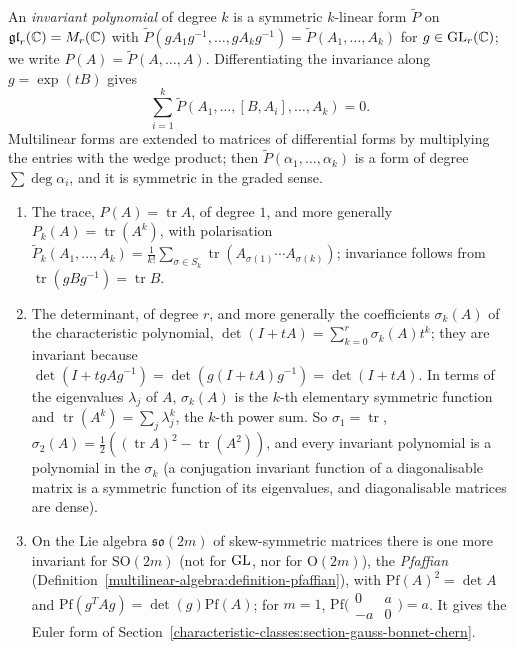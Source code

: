 \begin{definition}\label{characteristic-classes:definition-invariant-polynomial}
An \emph{invariant polynomial} of degree $k$ is a symmetric $k$-linear form $\tilde{P}$ on $\mathfrak{gl}_r(\mathbb{C}) = M_r(\mathbb{C})$ with
$\tilde{P}(gA_1g^{-1}, \ldots, gA_kg^{-1}) = \tilde{P}(A_1, \ldots, A_k)$ for $g \in \mathrm{GL}_r(\mathbb{C})$; we write $P(A) = \tilde{P}(A, \ldots, A)$. Differentiating the invariance along $g = \exp(tB)$ gives
\[
\sum_{i=1}^k\tilde{P}(A_1, \ldots, [B, A_i], \ldots, A_k) = 0 .
\]
Multilinear forms are extended to matrices of differential forms by multiplying the entries with the wedge product; then $\tilde{P}(\alpha_1, \ldots, \alpha_k)$ is a form of degree $\sum\deg\alpha_i$, and it is
symmetric in the graded sense.
\end{definition}

\begin{example}\label{characteristic-classes:example-invariant-polynomials}
\begin{enumerate}
\item The trace, $P(A) = \operatorname{tr}A$, of degree $1$, and more generally $P_k(A) = \operatorname{tr}(A^k)$, with polarisation
$\tilde P_k(A_1, \ldots, A_k) = \frac1{k!}\sum_{\sigma \in S_k}\operatorname{tr}(A_{\sigma(1)} \cdots A_{\sigma(k)})$; invariance follows from $\operatorname{tr}(gBg^{-1}) = \operatorname{tr}B$.
\item The determinant, of degree $r$, and more generally the coefficients $\sigma_k(A)$ of the characteristic polynomial,
$\det(I + tA) = \sum_{k=0}^r\sigma_k(A)t^k$; they are invariant because $\det(I + tgAg^{-1}) = \det(g(I + tA)g^{-1}) = \det(I + tA)$. In terms of the eigenvalues $\lambda_j$ of $A$,
$\sigma_k(A)$ is the $k$-th elementary symmetric function and $\operatorname{tr}(A^k) = \sum_j\lambda_j^k$, the $k$-th power sum. So $\sigma_1 = \operatorname{tr}$,
$\sigma_2(A) = \frac12((\operatorname{tr}A)^2 - \operatorname{tr}(A^2))$, and every invariant polynomial is a polynomial in the $\sigma_k$ (a conjugation invariant function of a
diagonalisable matrix is a symmetric function of its eigenvalues, and diagonalisable matrices are dense).
\item On the Lie algebra $\mathfrak{so}(2m)$ of skew-symmetric matrices there is one more invariant for $\mathrm{SO}(2m)$ (not for $\mathrm{GL}$, nor for $\mathrm{O}(2m)$), the
\emph{Pfaffian} (Definition~\ref{multilinear-algebra:definition-pfaffian}), with $\mathrm{Pf}(A)^2 = \det A$ and $\mathrm{Pf}(g^TAg) = \det(g)\mathrm{Pf}(A)$; for $m = 1$,
$\mathrm{Pf}\bigl(\begin{smallmatrix} 0 & a\\ -a & 0\end{smallmatrix}\bigr) = a$. It gives the Euler form of Section~\ref{characteristic-classes:section-gauss-bonnet-chern}.
\end{enumerate}
\end{example}

